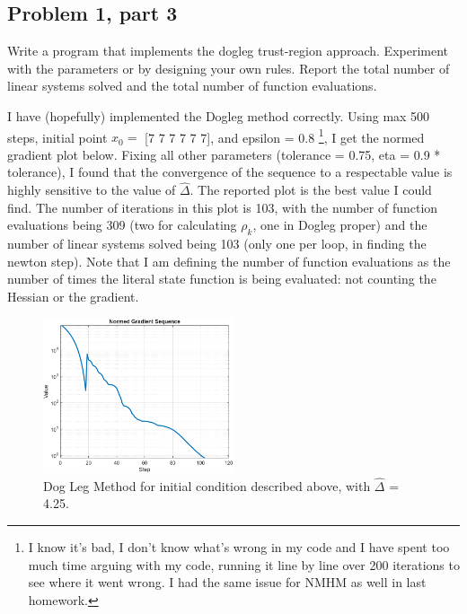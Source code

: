 \subsection{Problem 1, part 3}
Write a program that implements the dogleg trust-region approach. Experiment with the parameters or by designing your own rules. Report the total number of linear systems solved and the total number of function evaluations.
\partbreak
\begin{solution}

    I have (hopefully) implemented the Dogleg method correctly. Using max 500 steps, initial point $x_0 = $ [7 7 7 7 7 7], and epsilon = 0.8 \footnote{I know it's bad, I don't know what's wrong in my code and I have spent too much time arguing with my code, running it line by line over 200 iterations to see where it went wrong. I had the same issue for NMHM as well in last homework.}, I get the normed gradient plot below. Fixing all other parameters (tolerance = 0.75, eta = 0.9 * tolerance), I found that the convergence of the sequence to a respectable value is highly sensitive to the value of $\hat{\Delta}$. The reported plot is the best value I could find. The number of iterations in this plot is 103, with the number of function evaluations being 309 (two for calculating $\rho_k$, one in Dogleg proper) and the number of linear systems solved being 103 (only one per loop, in finding the newton step). Note that I am defining the number of function evaluations as the number of times the literal state function is being evaluated: not counting the Hessian or the gradient. 
\end{solution}

\begin{figure}[!h]
    \centering
    \includegraphics[width = 0.5\textwidth]{Plots/Figure_p4p1p3_NG.png}
    \caption{Dog Leg Method for initial condition described above, with $\hat{\Delta}$ = 4.25.}
    \label{fig:hw4p1p3}
\end{figure}


